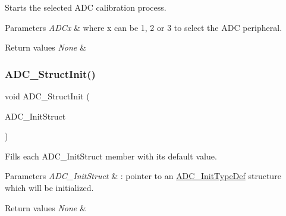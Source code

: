 Starts the selected A\+DC calibration process. 


\begin{DoxyParams}{Parameters}
{\em A\+D\+Cx} & where x can be 1, 2 or 3 to select the A\+DC peripheral. \\
\hline
\end{DoxyParams}

\begin{DoxyRetVals}{Return values}
{\em None} & \\
\hline
\end{DoxyRetVals}
\mbox{\label{group___a_d_c___exported___functions_ga6c6e754d1d0a98d56e465efaf73272ec}} 
\subsubsection{\texorpdfstring{ADC\_StructInit()}{ADC\_StructInit()}}
{\footnotesize\ttfamily void A\+D\+C\+\_\+\+Struct\+Init (\begin{DoxyParamCaption}\item[{\mbox{\hyperlink{struct_a_d_c___init_type_def}{A\+D\+C\+\_\+\+Init\+Type\+Def}} $\ast$}]{A\+D\+C\+\_\+\+Init\+Struct }\end{DoxyParamCaption})}



Fills each A\+D\+C\+\_\+\+Init\+Struct member with its default value. 


\begin{DoxyParams}{Parameters}
{\em A\+D\+C\+\_\+\+Init\+Struct} & \+: pointer to an \mbox{\hyperlink{struct_a_d_c___init_type_def}{A\+D\+C\+\_\+\+Init\+Type\+Def}} structure which will be initialized. \\
\hline
\end{DoxyParams}

\begin{DoxyRetVals}{Return values}
{\em None} & \\
\hline
\end{DoxyRetVals}
\mbox{\label{group___a_d_c___exported___functions_ga848682e2d7d3de9f8cf03ffa4c11f0b5}} 
